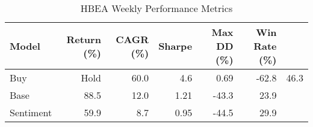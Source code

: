 \begin{table}[h]
\centering
\caption{HBEA Weekly Performance Metrics}
\begin{tabular}{lrrrrr}
\hline
Model & Return (\%) & CAGR (\%) & Sharpe & Max DD (\%) & Win Rate (\%) \\
\hline
Buy&Hold & 60.0 & 4.6 & 0.69 & -62.8 & 46.3 \\
Base & 88.5 & 12.0 & 1.21 & -43.3 & 23.9 \\
Sentiment & 59.9 & 8.7 & 0.95 & -44.5 & 29.9 \\
\hline
\end{tabular}
\end{table}